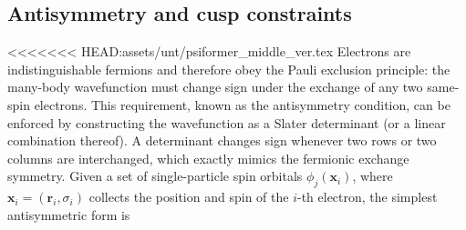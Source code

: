 \subsection{Antisymmetry and cusp constraints}

<<<<<<< HEAD:assets/unt/psiformer_middle_ver.tex
Electrons are indistinguishable fermions and therefore obey the Pauli exclusion principle: the many-body wavefunction must change sign under the exchange of any two same-spin electrons. This requirement, known as the antisymmetry condition, can be enforced by constructing the wavefunction as a Slater determinant (or a linear combination thereof). A determinant changes sign whenever two rows or two columns are interchanged, which exactly mimics the fermionic exchange symmetry. Given a set of single-particle spin orbitals $\phi_j(\mathbf{x}_i)$, where $\mathbf{x}_i=(\mathbf{r}_i,\sigma_i)$ collects the position and spin of the $i$-th electron, the simplest antisymmetric form is

